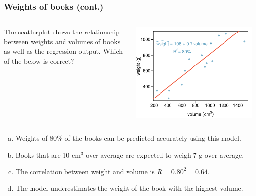 \documentclass{beamer}
\begin{document}

\begin{frame}
\frametitle{Weights of books (cont.)}

\begin{columns}
\begin{column}{0.45\textwidth}
{\small The scatterplot shows the relationship between weights and volumes of books as well as the regression output. Which of the below is correct?}
\end{column}
\begin{column}{0.45\textwidth}
\begin{center}
\includegraphics[width=\textwidth]{plots/weight_volume}
\end{center}
\end{column}
\end{columns}


\begin{enumerate}[(a)]
\item \pause Weights of 80\% of the books can be predicted accurately using this model.
\item \pause Books that are 10 cm$^\text{3}$ over average are expected to weigh 7 g over average.
\item \pause The correlation between weight and volume is $R = 0.80^2 = 0.64$.
\item \pause The model underestimates the weight of the book with the highest volume.
\end{enumerate}

\end{frame}
\end{document}
